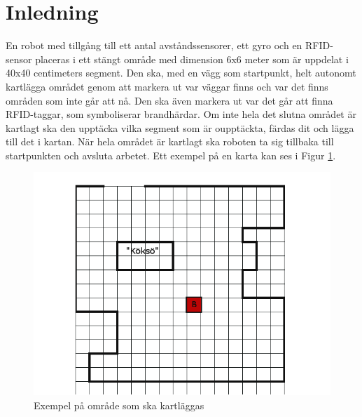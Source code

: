 ﻿\documentclass[a4paper,12pt,fleqn]{article}
\begin{document}
\addto\captionsswedish{\renewcommand{\contentsname}{Innehållsförteckning}}

\tableofcontents
\thispagestyle{fancy}
\newpage


\section{Inledning}

En robot med tillgång till ett antal avståndssensorer, ett gyro och en RFID-sensor placeras i ett stängt område med dimension 6x6 meter som är uppdelat i 40x40 centimeters segment. 
Den ska, med en vägg som startpunkt, helt autonomt kartlägga området genom att markera ut var väggar finns och var det finns områden som inte går att nå. 
Den ska även markera ut var det går att finna RFID-taggar, som symboliserar brandhärdar. 
Om inte hela det slutna området är kartlagt ska den upptäcka vilka segment som är oupptäckta, färdas dit och lägga till det i kartan. 
När hela området är kartlagt ska roboten ta sig tillbaka till startpunkten och avsluta arbetet. Ett exempel på en karta kan ses i Figur \ref{fig:omrade}.
\begin{figure}[htp] %
  \begin{center}
  \includegraphics[keepaspectratio=true,scale=0.5]{gimpmap.png}  %
  \end{center}
  \caption{Exempel på område som ska kartläggas} %
  \label{fig:omrade}
\end{figure}
\end{document}
